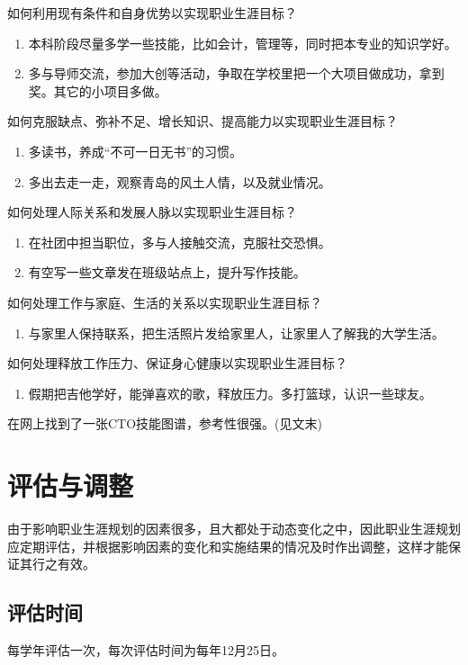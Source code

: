 \documentclass{article}
\begin{document}
 如何利用现有条件和自身优势以实现职业生涯目标？
 \begin{enumerate}
 \item 本科阶段尽量多学一些技能，比如会计，管理等，同时把本专业的知识学好。
 \item 多与导师交流，参加大创等活动，争取在学校里把一个大项目做成功，拿到奖。其它的小项目多做。

 \end{enumerate}
 如何克服缺点、弥补不足、增长知识、提高能力以实现职业生涯目标？
 \begin{enumerate}
 	\item 多读书，养成“不可一日无书”的习惯。
 	\item 多出去走一走，观察青岛的风土人情，以及就业情况。
 	\end{enumerate}
 如何处理人际关系和发展人脉以实现职业生涯目标？
 \begin{enumerate}
\item 在社团中担当职位，多与人接触交流，克服社交恐惧。
\item 有空写一些文章发在班级站点上，提升写作技能。
 \end{enumerate}
 如何处理工作与家庭、生活的关系以实现职业生涯目标？
 \begin{enumerate}
\item 与家里人保持联系，把生活照片发给家里人，让家里人了解我的大学生活。
 \end{enumerate}
 如何处理释放工作压力、保证身心健康以实现职业生涯目标？
\begin{enumerate}
	\item 假期把吉他学好，能弹喜欢的歌，释放压力。多打篮球，认识一些球友。
\end{enumerate}
在网上找到了一张CTO技能图谱，参考性很强。(见文末)
\section{评估与调整}
由于影响职业生涯规划的因素很多，且大都处于动态变化之中，因此职业生涯规划应定期评估，并根据影响因素的变化和实施结果的情况及时作出调整，这样才能保证其行之有效。\par 
\subsection{评估时间}
每学年评估一次，每次评估时间为每年12月25日。\par
\end{document}
